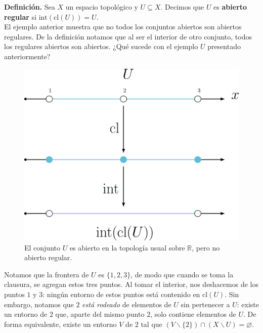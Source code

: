\documentclass{article}
\begin{document}
\textbf{Definición. } Sea $X$ un espacio topológico y $U \subseteq X$. Decimos que $U$ es \textbf{abierto regular} si $\text{int}(\text{cl}(U)) = U$. \\

El ejemplo anterior muestra que no todos los conjuntos abiertos son abiertos regulares. De la definición notamos que al ser el interior de otro conjunto, todos los regulares abiertos son abiertos. ¿Qué sucede con el ejemplo $U$ presentado anteriormente?

\begin{figure}[h]
	\centering \includegraphics[scale=0.13]{e2fig3.png}
	\caption{El conjunto $U$ es abierto en la topología usual sobre $\mathbb{R}$, pero no abierto regular. }
\end{figure}

Notamos que la frontera de $U$ es $\{ 1, 2, 3 \}$, de modo que cuando se toma la clausura, se agregan estos tres puntos. Al tomar el interior, nos deshacemos de los puntos $1$ y $3$: ningún entorno de estos puntos está contenido en $\text{cl}(U)$. Sin embargo, notamos que $2$ \textit{está rodeado} de elementos de $U$ sin pertenecer a $U$: existe un entorno de $2$ que, aparte del mismo punto $2$, solo contiene elementos de $U$. De forma equivalente, existe un entorno $V$ de $2$ tal que $( V \backslash \{ 2 \} )\cap (X \backslash U) = \varnothing$. \\
\end{document}
